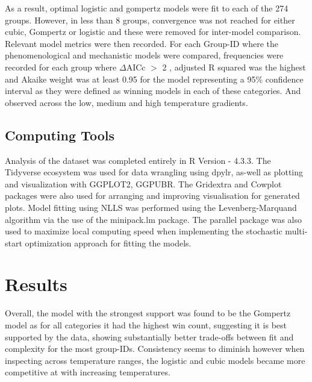 \documentclass[11pt]{article}
\begin{document}
As a result, optimal logistic and gompertz models were fit to each of the 274 groups. However, in less than 8 groups, convergence was not reached for either cubic, Gompertz or logistic and these were removed for inter-model comparison. Relevant model metrics were then recorded. For each Group-ID where the phenomenological and mechanistic models were compared, frequencies were recorded for each group where $\Delta$AICc $>$ 2 \cite{anderson2004model}, adjusted R squared was the highest and Akaike weight was at least 0.95 for the model representing a 95\% confidence interval\cite{posada2004model} as they were defined as winning models in each of these categories. And observed across the low, medium and high temperature gradients. 


    \subsection{Computing Tools}
     Analysis of the dataset was completed entirely in \textbf{}{R Version - 4.3.3}. The Tidyverse ecosystem was used for data wrangling using dpylr, as-well as plotting and visualization with GGPLOT2, GGPUBR. The Gridextra and Cowplot packages were also used for arranging and improving visualisation for generated plots. Model fitting using NLLS was performed using the Levenberg-Marquand algorithm via the use of the minipack.lm package. The parallel package was also used to maximize local computing speed when implementing the stochastic multi-start optimization approach for fitting the models.  


\section{Results}

Overall, the model with the strongest support was found to be the Gompertz model as for all categories it had the highest win count, suggesting it is best supported by the data, showing substantially better trade-offs between fit and complexity for the most group-IDs. Consistency seems to diminish however when inspecting across temperature ranges, the logistic and cubic models became more competitive at with increasing temperatures.
\end{document}
